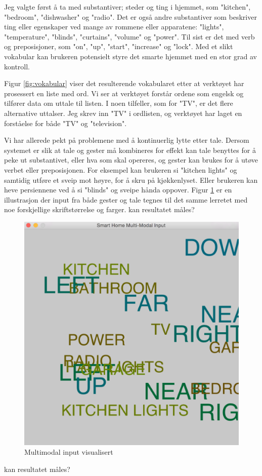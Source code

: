Jeg valgte først å ta med substantiver; steder og ting i hjemmet, som "kitchen", "bedroom", "dishwasher" og "radio". Det er også andre substantiver som beskriver ting eller egenskaper ved mange av rommene eller apparatene: "lights", "temperature", "blinds", "curtains", "volume" og "power". Til sist er det med verb og preposisjoner, som "on", "up", "start", "increase" og "lock". Med et slikt vokabular kan brukeren potensielt styre det smarte hjemmet med en stor grad av kontroll.

Figur \ref{fig:vokabular} viser det resulterende vokabularet etter at verktøyet har prosessert en liste med ord. Vi ser at verktøyet forstår ordene som engelsk og tilfører data om uttale til listen. I noen tilfeller, som for "TV", er det flere alternative uttalser. Jeg skrev inn "TV" i ordlisten, og verktøyet har laget en forståelse for både "TV" og "television".

Vi har allerede pekt på problemene med å kontinuerlig lytte etter tale. Dersom systemet er slik at tale og gester må kombineres for effekt kan tale benyttes for å peke ut substantivet, eller hva som skal opereres, og gester kan brukes for å utøve verbet eller preposisjonen. For eksempel kan brukeren si "kitchen lights" og samtidig utføre et sveip mot høyre, for å skru på kjøkkenlyset. Eller brukeren kan heve persiennene ved å si "blinds" og sveipe hånda oppover. Figur \ref{fig:multimodalvisualisert} er en illustrasjon der input fra både gester og tale tegnes til det samme lerretet med noe forskjellige skriftstørrelse og farger. {\color{red}kan resultatet måles?}
\begin{figure}
\centering
\includegraphics[scale=0.2]{fig/screenshot_project2}
\caption{Multimodal input visualisert}
\label{fig:multimodalvisualisert}
\end{figure}
{\color{red}kan resultatet måles?}

